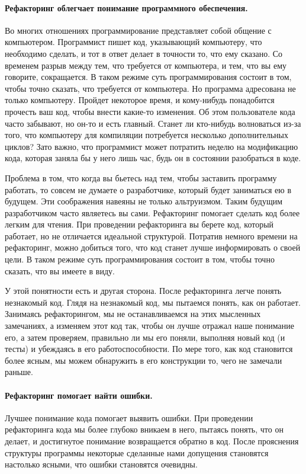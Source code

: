 \documentclass{../../text-style}
\begin{document}
\paragraph{Рефакторинг облегчает понимание программного обеспечения.} Во многих отношениях программирование представляет собой общение с компьютером. Программист пишет код, указывающий компьютеру, что необходимо сделать, и тот в ответ делает в точности то, что ему сказано. Со временем разрыв между тем, что требуется от компьютера, и тем, что вы ему говорите, сокращается. В таком режиме суть программирования состоит в том, чтобы точно сказать, что требуется от компьютера. Но программа адресована не только компьютеру. Пройдет некоторое время, и кому-нибудь понадобится прочесть ваш код, чтобы внести какие-то изменения. Об этом пользователе кода часто забывают, но он-то и есть главный. Станет ли кто-нибудь волноваться из-за того, что компьютеру для компиляции потребуется несколько дополнительных циклов? Зато важно, что программист может потратить неделю на модификацию кода, которая заняла бы у него лишь час, будь он в состоянии разобраться в коде.

Проблема в том, что когда вы бьетесь над тем, чтобы заставить программу работать, то совсем не думаете о разработчике, который будет заниматься ею в будущем. Эти соображения навеяны не только альтруизмом. Таким будущим разработчиком часто являетесь вы сами. Рефакторинг помогает сделать код более легким для чтения. При проведении рефакторинга вы берете код, который работает, но не отличается идеальной структурой. Потратив немного времени на рефакторинг, можно добиться того, что код станет лучше информировать о своей цели. В таком режиме суть программирования состоит в том, чтобы точно сказать, что вы имеете в виду.

У этой понятности есть и другая сторона. После рефакторинга легче понять незнакомый код. Глядя на незнакомый код, мы пытаемся понять, как он работает. Занимаясь рефакторингом, мы не останавливаемся на этих мысленных замечаниях, а изменяем этот код так, чтобы он лучше отражал наше понимание его, а затем проверяем, правильно ли мы его поняли, выполняя новый код (и тесты) и убеждаясь в его работоспособности. По мере того, как код становится более ясным, мы можем обнаружить в его конструкции то, чего не замечали раньше. 

\paragraph{Рефакторинг помогает найти ошибки.} Лучшее понимание кода помогает выявить ошибки. При проведении рефакторинга кода мы более глубоко вникаем в него, пытаясь понять, что он делает, и достигнутое понимание возвращается обратно в код. После прояснения структуры программы некоторые сделанные нами допущения становятся настолько ясными, что ошибки становятся очевидны.
\end{document}
